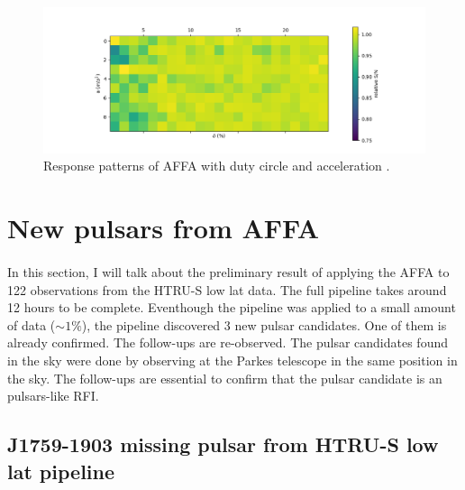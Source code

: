 \documentclass[thesis_msc.tex]{subfiles}
\begin{document}
\begin{figure}[h!]
\centering
\includegraphics[width=1.0\textwidth]{figures/a-d.png}
\caption{Response patterns of AFFA with duty circle and acceleration .}\label{a-d}
\end{figure}



	\section{New pulsars from AFFA}
  \paragraph{} In this section, I will talk about the preliminary result of applying the AFFA to 122 observations from the HTRU-S low lat data. The full pipeline takes around 12 hours to be complete. Eventhough the pipeline was applied to a small amount of data ($\sim 1 \%$), the pipeline discovered 3 new pulsar candidates. One of them is already confirmed. The follow-ups are re-observed. The pulsar candidates found in the sky were done by observing at the Parkes telescope in the same position in the sky. The follow-ups are essential to confirm that the pulsar candidate is an pulsars-like RFI.  

    \subsection{J1759-1903 missing pulsar from HTRU-S low lat pipeline }
\end{document}
